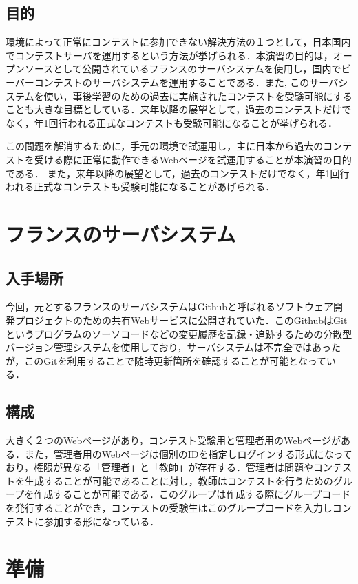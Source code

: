 \documentclass[a4paper]{jarticle}
\begin{document}
\begin{multicols}{2}
\subsection{目的}
環境によって正常にコンテストに参加できない解決方法の１つとして，日本国内でコンテストサーバを運用するという方法が挙げられる．本演習の目的は，オープンソースとして公開されているフランスのサーバシステムを使用し，国内でビーバーコンテストのサーバシステムを運用することである．また, このサーバシステムを使い，事後学習のための過去に実施されたコンテストを受験可能にすることも大きな目標としている．来年以降の展望として，過去のコンテストだけでなく，年1回行われる正式なコンテストも受験可能になることが挙げられる．

この問題を解消するために，手元の環境で試運用し，主に日本から過去のコンテストを受ける際に正常に動作できるWebページを試運用することが本演習の目的である．
また，来年以降の展望として，過去のコンテストだけでなく，年1回行われる正式なコンテストも受験可能になることがあげられる．
\fi	%

\section{フランスのサーバシステム}
\subsection{入手場所}
今回，元とするフランスのサーバシステムはGithubと呼ばれるソフトウェア開発プロジェクトのための共有Webサービスに公開されていた．このGithubはGitというプログラムのソーソコードなどの変更履歴を記録・追跡するための分散型バージョン管理システムを使用しており，サーバシステムは不完全ではあったが，このGitを利用することで随時更新箇所を確認することが可能となっている．

\subsection{構成}
大きく２つのWebページがあり，コンテスト受験用と管理者用のWebページがある．また，管理者用のWebページは個別のIDを指定しログインする形式になっており，権限が異なる「管理者」と「教師」が存在する．管理者は問題やコンテストを生成することが可能であることに対し，教師はコンテストを行うためのグループを作成することが可能である．このグループは作成する際にグループコードを発行することができ，コンテストの受験生はこのグループコードを入力しコンテストに参加する形になっている．



\section{準備}


\end{multicols}
\end{document}
